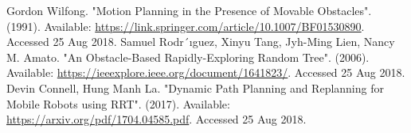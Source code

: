 \begin{thebibliography}{99}

 Gordon Wilfong. "Motion Planning in the Presence of Movable Obstacles". (1991). Available: \url{https://link.springer.com/article/10.1007/BF01530890}. Accessed 25 Aug 2018.
 Samuel Rodr´ıguez, Xinyu Tang, Jyh-Ming Lien, Nancy M. Amato. "An Obstacle-Based Rapidly-Exploring Random Tree". (2006). Available: \url{https://ieeexplore.ieee.org/document/1641823/}. Accessed 25 Aug 2018.
 Devin Connell, Hung Manh La. "Dynamic Path Planning and Replanning for Mobile Robots using RRT". (2017). Available: \url{https://arxiv.org/pdf/1704.04585.pdf}. Accessed 25 Aug 2018.

\end{thebibliography}
